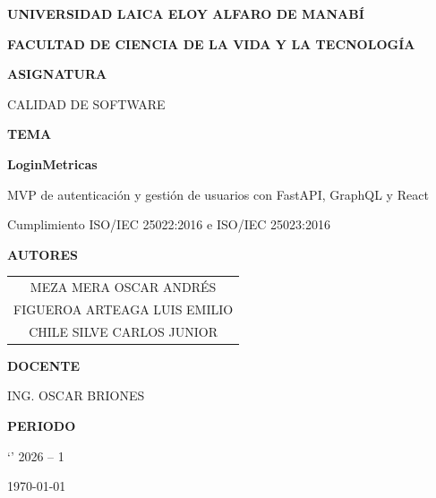 \documentclass[11pt,a4paper]{article}
\newcommand{\fechaEntrega}{\today}
\begin{document}
\begin{titlepage}
  \centering
  \vspace*{1.2cm}
  {\Large\bfseries UNIVERSIDAD LAICA ELOY ALFARO DE MANABÍ\par}
  \vspace{0.6cm}
  {\large\bfseries FACULTAD DE CIENCIA DE LA VIDA Y LA TECNOLOGÍA\par}
  \vspace{2.2cm}

  {\large\bfseries ASIGNATURA\par}
  \vspace{0.35cm}
  {\Large CALIDAD DE SOFTWARE\par}
  \vspace{2cm}

  {\large\bfseries TEMA\par}
  \vspace{0.35cm}
  {\Large\bfseries LoginMetricas\par}
  \vspace{0.25cm}
  {\normalsize MVP de autenticación y gestión de usuarios con FastAPI, GraphQL y React\par}
  \vspace{0.2cm}
  {\normalsize Cumplimiento ISO/IEC 25022:2016 e ISO/IEC 25023:2016\par}
  \vspace{2.2cm}

  {\large\bfseries AUTORES\par}
  \vspace{0.5cm}
  \begin{tabular}{c}
    MEZA MERA OSCAR ANDRÉS \\[0.35cm]
    FIGUEROA ARTEAGA LUIS EMILIO \\[0.35cm]
    CHILE SILVE CARLOS JUNIOR \\
  \end{tabular}
  \vfill

  {\large\bfseries DOCENTE\par}
  \vspace{0.35cm}
  ING. OSCAR BRIONES\par
  \vspace{1.2cm}

  {\large\bfseries PERIODO\par}
  \vspace{0.35cm}`'
  2026 -- 1\par
  \vspace{1cm}
  {\normalsize \fechaEntrega\par}
\end{titlepage}
\setcounter{page}{1}
\end{document}
